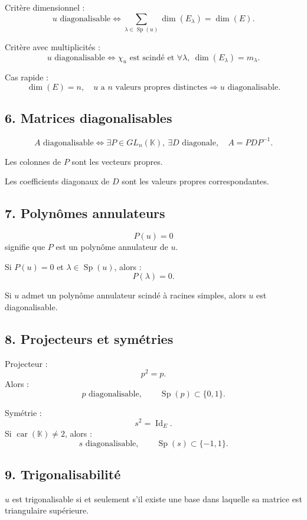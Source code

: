 \documentclass[11pt,a4paper]{article}
\newcommand{\K}{\mathbb K}
\newcommand{\Id}{\operatorname{Id}}
\newcommand{\Sp}{\operatorname{Sp}}
\begin{document}
Critère dimensionnel :
\[
u\text{ diagonalisable}
\Longleftrightarrow
\sum_{\lambda\in\Sp(u)}\dim(E_\lambda)=\dim(E).
\]

Critère avec multiplicités :
\[
u\text{ diagonalisable}
\Longleftrightarrow
\chi_u\text{ est scindé et }
\forall\lambda,\ \dim(E_\lambda)=m_\lambda.
\]

Cas rapide :
\[
\dim(E)=n,\quad u\text{ a }n\text{ valeurs propres distinctes}
\Longrightarrow
u\text{ diagonalisable}.
\]

\subsection*{6. Matrices diagonalisables}

\[
A\text{ diagonalisable}
\Longleftrightarrow
\exists P\in GL_n(\K),\ \exists D\text{ diagonale},\quad A=PDP^{-1}.
\]

Les colonnes de \(P\) sont les vecteurs propres.

Les coefficients diagonaux de \(D\) sont les valeurs propres correspondantes.

\subsection*{7. Polynômes annulateurs}

\[
P(u)=0
\]
signifie que \(P\) est un polynôme annulateur de \(u\).

Si \(P(u)=0\) et \(\lambda\in\Sp(u)\), alors :
\[
P(\lambda)=0.
\]

Si \(u\) admet un polynôme annulateur scindé à racines simples, alors \(u\) est diagonalisable.

\subsection*{8. Projecteurs et symétries}

Projecteur :
\[
p^2=p.
\]
Alors :
\[
p\text{ diagonalisable},\qquad \Sp(p)\subset\{0,1\}.
\]

Symétrie :
\[
s^2=\Id_E.
\]
Si \(\operatorname{car}(\K)\neq2\), alors :
\[
s\text{ diagonalisable},\qquad \Sp(s)\subset\{-1,1\}.
\]

\subsection*{9. Trigonalisabilité}

\(u\) est trigonalisable si et seulement s'il existe une base dans laquelle sa matrice est triangulaire supérieure.
\end{document}
